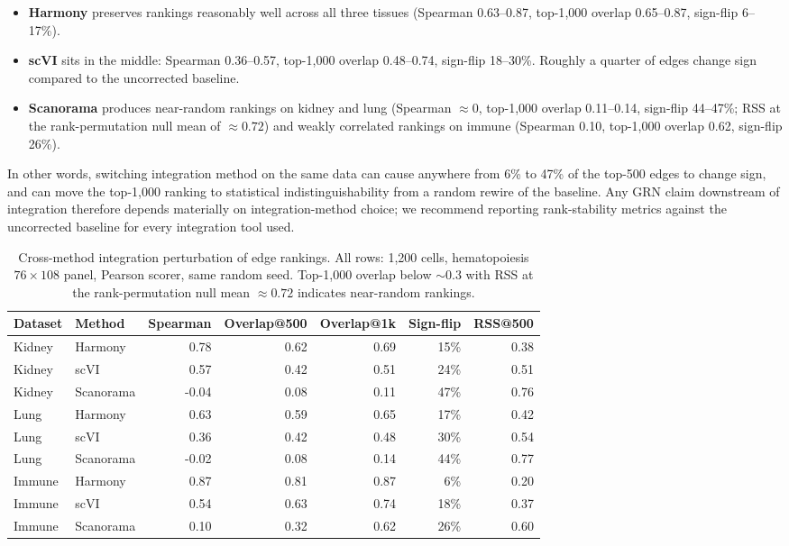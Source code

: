 \documentclass[unnumsec,webpdf,contemporary,large,namedate]{oup-authoring-template}
\begin{document}
\begin{itemize}
\item \textbf{Harmony} preserves rankings reasonably well across all
      three tissues (Spearman 0.63--0.87, top-1{,}000 overlap
      0.65--0.87, sign-flip 6--17\%).
\item \textbf{scVI} sits in the middle: Spearman 0.36--0.57, top-1{,}000
      overlap 0.48--0.74, sign-flip 18--30\%. Roughly a quarter of
      edges change sign compared to the uncorrected baseline.
\item \textbf{Scanorama} produces near-random rankings on kidney and
      lung (Spearman $\approx 0$, top-1{,}000 overlap 0.11--0.14,
      sign-flip 44--47\%; RSS at the rank-permutation null mean of
      $\approx 0.72$) and weakly correlated rankings on immune
      (Spearman 0.10, top-1{,}000 overlap 0.62, sign-flip 26\%).
\end{itemize}

In other words, switching integration method on the same data can
cause anywhere from 6\% to 47\% of the top-500 edges to change sign,
and can move the top-1{,}000 ranking to statistical indistinguishability
from a random rewire of the baseline. Any GRN claim downstream of
integration therefore depends materially on integration-method choice;
we recommend reporting rank-stability metrics against the uncorrected
baseline for every integration tool used.

\begin{table}[ht]
\centering
\caption{Cross-method integration perturbation of edge rankings.
All rows: 1{,}200 cells, hematopoiesis $76 \times 108$ panel,
Pearson scorer, same random seed. Top-1{,}000 overlap below $\sim 0.3$
with RSS at the rank-permutation null mean $\approx 0.72$ indicates
near-random rankings.}
\label{tab:integration_methods}
\small
\begin{tabular}{llrrrrr}
\toprule
\textbf{Dataset} & \textbf{Method} & \textbf{Spearman} &
\textbf{Overlap@500} & \textbf{Overlap@1k} &
\textbf{Sign-flip} & \textbf{RSS@500} \\
\midrule
Kidney & Harmony    &  0.78 & 0.62 & 0.69 & 15\% & 0.38 \\
Kidney & scVI       &  0.57 & 0.42 & 0.51 & 24\% & 0.51 \\
Kidney & Scanorama  & -0.04 & 0.08 & 0.11 & 47\% & 0.76 \\
Lung   & Harmony    &  0.63 & 0.59 & 0.65 & 17\% & 0.42 \\
Lung   & scVI       &  0.36 & 0.42 & 0.48 & 30\% & 0.54 \\
Lung   & Scanorama  & -0.02 & 0.08 & 0.14 & 44\% & 0.77 \\
Immune & Harmony    &  0.87 & 0.81 & 0.87 &  6\% & 0.20 \\
Immune & scVI       &  0.54 & 0.63 & 0.74 & 18\% & 0.37 \\
Immune & Scanorama  &  0.10 & 0.32 & 0.62 & 26\% & 0.60 \\
\bottomrule
\end{tabular}
\end{table}
\end{document}
